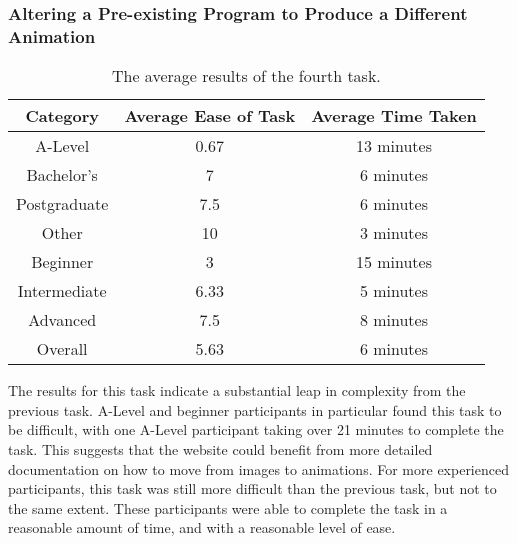 \documentclass[../main.tex]{subfiles}
\begin{document}
            \subsubsection{Altering a Pre-existing Program to Produce a Different Animation}
                \begin{table}[H]
                    \centering
                    \begin{tabular}{c|c|c}
                        \textbf{Category} & \textbf{Average Ease of Task} & \textbf{Average Time Taken} \\
                        \hline
                        A-Level           & 0.67                          & 13 minutes                  \\
                        Bachelor's        & 7                             & 6 minutes                   \\
                        Postgraduate      & 7.5                           & 6 minutes                   \\
                        Other             & 10                            & 3 minutes                   \\
                        \hline
                        Beginner          & 3                             & 15 minutes                  \\
                        Intermediate      & 6.33                          & 5 minutes                   \\
                        Advanced          & 7.5                           & 8 minutes                   \\
                        \hline
                        Overall           & 5.63                          & 6 minutes                   \\
                    \end{tabular}
                    \caption{The average results of the fourth task.}
                \end{table}

                The results for this task indicate a substantial leap in complexity from the
                    previous task.
                A-Level and beginner participants in particular found this task to be
                    difficult, with one A-Level participant taking over 21 minutes to complete the
                    task.
                This suggests that the website could benefit from more detailed documentation
                    on how to move from images to animations.
                For more experienced participants, this task was still more difficult than the
                    previous task, but not to the same extent.
                These participants were able to complete the task in a reasonable amount of
                    time, and with a reasonable level of ease.
\end{document}
